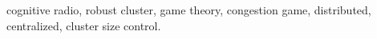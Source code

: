 \documentclass[10pt,journal,compsoc]{IEEEtran}
\theoremstyle{mytheoremstyle}
\theoremstyle{mytheoremstyle}
\theoremstyle{mytheoremstyle}
\begin{document}
\begin{IEEEkeywords}
cognitive radio, robust cluster, game theory, congestion game, distributed, centralized, cluster size control.
\end{IEEEkeywords}






%
\IEEEpeerreviewmaketitle

\graphicspath{
{../figures/04_clutering/}
}
\end{document}
